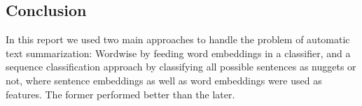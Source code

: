 \subsection{Conclusion}
In this report we used two main approaches to handle the problem of automatic text summarization: Wordwise by feeding word embeddings in a classifier,  and a sequence classification approach by classifying all possible sentences as nuggets or not, where sentence embeddings as well as word embeddings were used as features. The former performed better than the later.